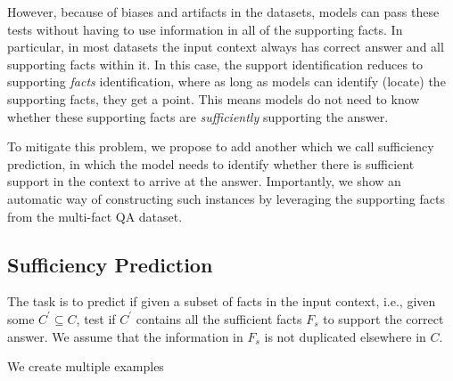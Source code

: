However, because of biases and artifacts in the datasets, models can pass these tests without having to use information in all of the supporting facts. In particular, in most \mf datasets the input context always has correct answer and all supporting facts within it.  In this case, the support identification reduces to supporting \textit{facts} identification, where as long as models can identify (locate) the supporting facts, they get a point. This means models do not need to know whether these supporting facts are {\em sufficiently} supporting the answer. 

To mitigate this problem, we propose to add another  which we call sufficiency prediction, in which the model needs to identify whether there is sufficient support in the context to arrive at the answer. Importantly, we show an automatic way of constructing such instances by leveraging the supporting facts from the multi-fact QA dataset. \\

\subsection{Sufficiency Prediction} 

The task is to predict if given a subset of facts in the input context, i.e., given some $C^{\prime} \subseteq C$, test if $C^{\prime}$ contains all the sufficient facts $F_s$ to support the correct answer. We assume that the information in $F_s$ is not duplicated elsewhere in $C$.

We create multiple examples 




